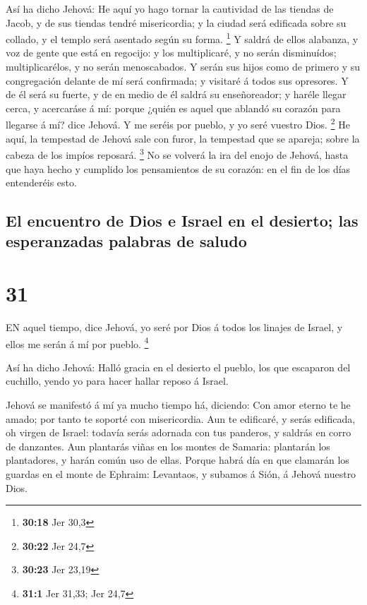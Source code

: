  Así ha dicho Jehová: He aquí yo hago tornar la cautividad
de las tiendas de Jacob, y de sus tiendas tendré misericordia; y la
ciudad será edificada sobre su collado, y el templo será asentado según
su forma. \footnote{\textbf{30:18} Jer 30,3}  Y saldrá de
ellos alabanza, y voz de gente que está en regocijo: y los multiplicaré,
y no serán disminuídos; multiplicarélos, y no serán menoscabados.
 Y serán sus hijos como de primero y su congregación
delante de mí será confirmada; y visitaré á todos sus opresores.
 Y de él será su fuerte, y de en medio de él saldrá su
enseñoreador; y haréle llegar cerca, y acercaráse á mí: porque ¿quién es
aquel que ablandó su corazón para llegarse á mí? dice Jehová.
 Y me seréis por pueblo, y yo seré vuestro Dios.
\footnote{\textbf{30:22} Jer 24,7}  He aquí, la tempestad
de Jehová sale con furor, la tempestad que se apareja; sobre la cabeza
de los impíos reposará. \footnote{\textbf{30:23} Jer 23,19}
 No se volverá la ira del enojo de Jehová, hasta que haya
hecho y cumplido los pensamientos de su corazón: en el fin de los días
entenderéis esto.

\hypertarget{el-encuentro-de-dios-e-israel-en-el-desierto-las-esperanzadas-palabras-de-saludo}{%
\subsection{El encuentro de Dios e Israel en el desierto; las
esperanzadas palabras de
saludo}\label{el-encuentro-de-dios-e-israel-en-el-desierto-las-esperanzadas-palabras-de-saludo}}

\hypertarget{section-30}{%
\section{31}\label{section-30}}

 EN aquel tiempo, dice Jehová, yo seré por Dios á todos los
linajes de Israel, y ellos me serán á mí por pueblo. \footnote{\textbf{31:1}
  Jer 31,33; Jer 24,7}

 Así ha dicho Jehová: Halló gracia en el desierto el pueblo,
los que escaparon del cuchillo, yendo yo para hacer hallar reposo á
Israel.

 Jehová se manifestó á mí ya mucho tiempo há, diciendo: Con
amor eterno te he amado; por tanto te soporté con misericordia.
 Aun te edificaré, y serás edificada, oh virgen de Israel:
todavía serás adornada con tus panderos, y saldrás en corro de
danzantes.  Aun plantarás viñas en los montes de Samaria:
plantarán los plantadores, y harán común uso de ellas. 
Porque habrá día en que clamarán los guardas en el monte de Ephraim:
Levantaos, y subamos á Sión, á Jehová nuestro Dios.

